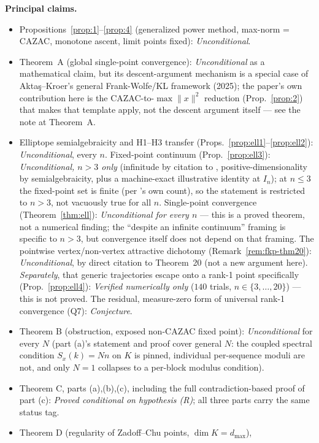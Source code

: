 \documentclass[11pt]{article}
\theoremstyle{plain}
\theoremstyle{definition}
\theoremstyle{remark}
\begin{document}
\textbf{Principal claims.}
\begin{itemize}
\item Propositions~\ref{prop:1}--\ref{prop:4} (generalized power method,
max-norm = CAZAC, monotone ascent, limit points fixed): \emph{Unconditional}.
\item Theorem~A (global single-point convergence): \emph{Unconditional}
as a mathematical claim, but its descent-argument mechanism is a special
case of Akta\c{s}--Kroer's \cite{AK25} general Frank-Wolfe/KL framework
(2025); the paper's own contribution here is the CAZAC-to-$\max\|x\|^2$
reduction (Prop.~\ref{prop:2}) that makes that template apply, not the
descent argument itself --- see the note at Theorem~A.
\item Elliptope semialgebraicity and H1--H3 transfer
(Props.~\ref{prop:ell1}--\ref{prop:ell2}): \emph{Unconditional}, every $n$.
Fixed-point continuum (Prop.~\ref{prop:ell3}): \emph{Unconditional, $n>3$
only} (infinitude by citation to \cite{FKP21}, positive-dimensionality by
semialgebraicity, plus a machine-exact illustrative identity at $I_n$); at
$n\le3$ the fixed-point set is finite (per \cite{FKP21}'s own count), so
the statement is restricted to $n>3$, not vacuously true for all $n$.
Single-point convergence (Theorem~\ref{thm:ell}): \emph{Unconditional for
every $n$} --- this is a proved theorem, not a numerical finding; the
``despite an infinite continuum'' framing is specific to $n>3$, but
convergence itself does not depend on that framing. The pointwise
vertex/non-vertex attractive
dichotomy (Remark~\ref{rem:fkp-thm20}): \emph{Unconditional}, by direct
citation to \cite{FKP21} Theorem~20 (not a new argument here).
\emph{Separately}, that generic trajectories escape onto a rank-1 point
specifically (Prop.~\ref{prop:ell4}): \emph{Verified numerically only}
($140$ trials, $n\in\{3,\dots,20\}$) --- this is not proved. The residual,
measure-zero form of universal rank-1 convergence (Q7): \emph{Conjecture}.
\item Theorem B (obstruction, exposed non-CAZAC fixed point):
\emph{Unconditional} for every $N$ (part (a)'s statement and proof cover
general $N$: the coupled spectral condition $S_x(k)=Nn$ on $K$ is pinned,
individual per-sequence moduli are not, and only $N=1$ collapses to a
per-block modulus condition).
\item Theorem C, parts (a),(b),(c), including the full contradiction-based
proof of part (c): \emph{Proved conditional on hypothesis (R)}; all three
parts carry the same status tag.
\item Theorem D (regularity of Zadoff--Chu points, $\dim K=d_{\max}$),

\end{itemize}
\end{document}
